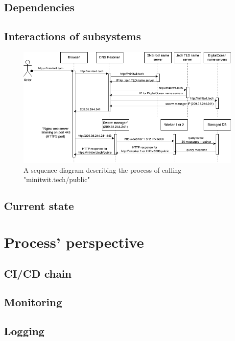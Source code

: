 \documentclass{article}
\begin{document}
\subsection{Dependencies}

\subsection{Interactions of subsystems}

\begin{figure}[H]
    \centering
    \includegraphics[width=\textwidth]{images/devops-sequence.png}
    \caption{A sequence diagram describing the process of calling "minitwit.tech/public"}
    \label{fig:sequence}
\end{figure}

\subsection{Current state}

\section{Process' perspective}

\subsection{CI/CD chain}

\subsection{Monitoring}

\subsection{Logging}
\end{document}
